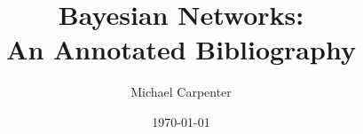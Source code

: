\documentclass{article}
\title{Bayesian Networks: \\ An Annotated Bibliography}
\author{Michael Carpenter}
\date{\today}
\begin{document}
\maketitle

\cite{HeckermanGC95}



\end{document}

